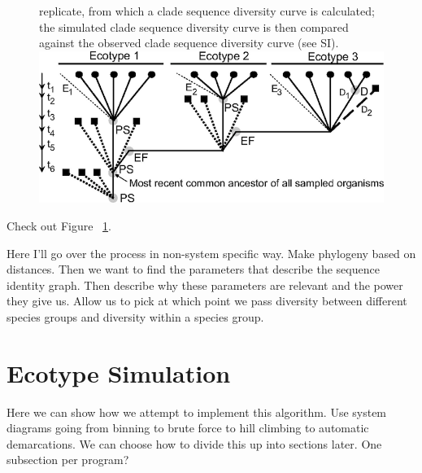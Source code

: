 \begin{figure}[h!]
replicate, from which a clade sequence diversity curve is calculated; the simulated clade sequence diversity curve is then compared against the observed clade sequence diversity curve (see SI).%
  \centering
  \label{fig:SpeciationGraph}
   \includegraphics{images/Speciation-CH2}
\end{figure}

Check out Figure ~\ref{fig:SpeciationGraph}.

Here I'll go over the process in non-system specific way. Make phylogeny based on distances. Then we want to find the parameters that describe the sequence identity graph. Then describe why these parameters are relevant and the power they give us. Allow us to pick at which point we pass diversity between different species groups and diversity within a species group.



\section{Ecotype Simulation}
Here we can show how we attempt to implement this algorithm. Use system diagrams going from binning to brute force to hill climbing to automatic demarcations. We can choose how to divide this up into sections later. One subsection per program?